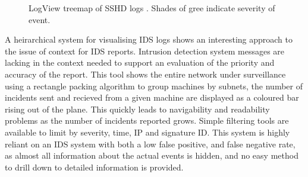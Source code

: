 \begin{figure}[tbh]
\caption{\protect\label{tree} LogView treemap of SSHD logs \cite{4641277}. Shades of gree indicate severity of event.}
\end{figure}

A heirarchical system for visualising IDS logs \cite{itoh2006hierarchical} shows an interesting approach to the issue of context for IDS reports. Intrusion detection system messages are lacking in the context needed to support an evaluation of the priority and accuracy of the report. This tool shows the entire network under surveillance using a rectangle packing algorithm to group machines by subnets, the number of incidents sent and recieved from a given machine are displayed as a coloured bar rising out of the plane. This quickly leads to navigability and readability problems as the number of incidents reported grows. Simple filtering tools are available to limit by severity, time, IP and signature ID.
This system is highly reliant on an IDS system with both a low false positive, and false negative rate, as almost all information about the actual events is hidden, and no easy method to drill down to detailed information is provided.

